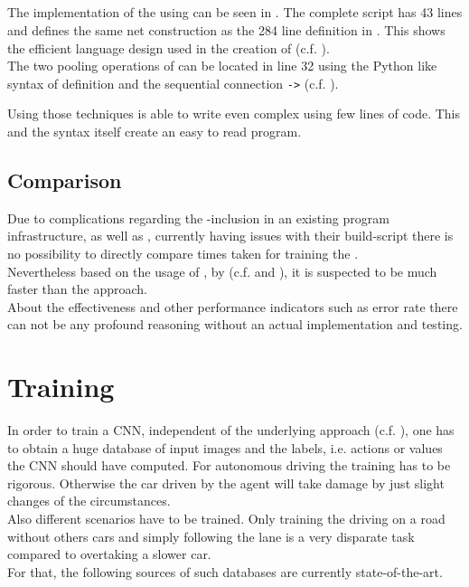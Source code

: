 \subsection{\cnnarch} \label{subsec: CNNArch Implementation}

The implementation of the \alexnet using \cnnarch can be seen in . The complete script has 43 lines and defines the same net construction as the 284 line definition in \caffe. This shows the efficient language design used in the creation of \cnnarch (c.f. ). \\
The two pooling operations of  can be located in line 32 using the Python like syntax of definition and the sequential connection \texttt{->} (c.f. ).

Using those techniques \cnnarch is able to write even complex \nn using few lines of code. This and the syntax itself create an easy to read program.

\subsection{Comparison}
Due to complications regarding the \cnnarch-inclusion in an existing program infrastructure, as well as \caffe, currently having issues with their build-script there is no possibility to directly compare times taken for training the \nn. \\
Nevertheless based on the usage of \mxnet, by \cnnarch (c.f.  and ), it is suspected to be much faster than the \caffe approach.\\
About the effectiveness and other performance indicators such as error rate there can not be any profound reasoning without an actual implementation and testing.

\section{Training}

In order to train a CNN, independent of the underlying approach (c.f. ), one has to obtain a huge database of input images and the labels, i.e. actions or values the CNN should have computed. For autonomous driving the training has to be rigorous. Otherwise the car driven by the agent will take damage by just slight changes of the circumstances.\\
Also different scenarios have to be trained. Only training the driving on a road without others cars and simply following the lane is a very disparate task compared to overtaking a slower car.\\
For that, the following sources of such databases are currently state-of-the-art.

